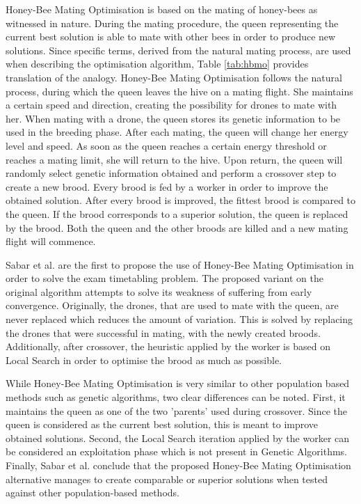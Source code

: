 Honey-Bee Mating Optimisation \cite{abbas2001} is based on the mating of honey-bees as witnessed in nature. During the mating procedure, the queen representing the current best solution is able to mate with other bees in order to produce new solutions. Since specific terms, derived from the natural mating process, are used when describing the optimisation algorithm, Table \ref{tab:hbmo} provides translation of the analogy. Honey-Bee Mating Optimisation follows the natural process, during which the queen leaves the hive on a mating flight. She maintains a certain speed and direction, creating the possibility for drones to mate with her. When mating with a drone, the queen stores its genetic information to be used in the breeding phase. After each mating, the queen will change her energy level and speed. As soon as the queen reaches a certain energy threshold or reaches a mating limit, she will return to the hive. Upon return, the queen will randomly select genetic information obtained and perform a crossover step to create a new brood. Every brood is fed by a worker in order to improve the obtained solution. After every brood is improved, the fittest brood is compared to the queen. If the brood corresponds to a superior solution, the queen is replaced by the brood. Both the queen and the other broods are killed and a new mating flight will commence. 

Sabar et al. \cite{Sabar2009} are the first to propose the use of Honey-Bee Mating Optimisation in order to solve the exam timetabling problem. The proposed variant on the original algorithm \cite{abbas2001} attempts to solve its weakness of suffering from early convergence. Originally, the drones, that are used to mate with the queen, are never replaced which reduces the amount of variation. This is solved by replacing the drones that were successful in mating, with the newly created broods. Additionally, after crossover, the heuristic applied by the worker is based on Local Search in order to optimise the brood as much as possible.

While Honey-Bee Mating Optimisation is very similar to other population based methods such as genetic algorithms, two clear differences can be noted. First, it maintains the queen as one of the two 'parents' used during crossover. Since the queen is considered as the current best solution, this is meant to improve obtained solutions. Second, the Local Search iteration applied by the worker can be considered an exploitation phase which is not present in Genetic Algorithms. Finally, Sabar et al. conclude that the proposed Honey-Bee Mating Optimisation alternative manages to create comparable or superior solutions when tested against other population-based methods.

